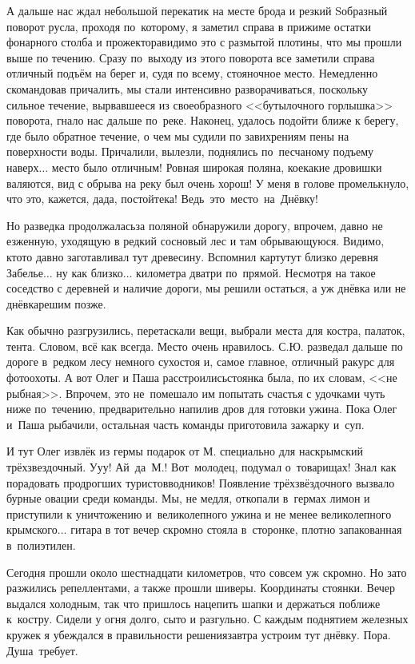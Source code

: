 А дальше нас ждал небольшой перекатик на месте брода и резкий S\sdash образный поворот русла, проходя по~которому, я заметил справа в прижиме остатки фонарного столба и прожектора\mdash видимо это с размытой плотины, что мы прошли выше по течению. Сразу по~выходу из этого поворота все заметили справа отличный подъём на берег и, судя по всему, стояночное место. Немедленно скомандовав причалить, мы стали интенсивно разворачиваться, поскольку сильное течение, вырвавшееся из своеобразного <<бутылочного горлышка>> поворота, гнало нас дальше по~реке. Наконец, удалось подойти ближе к берегу, где было обратное течение, о чем мы судили по завихрениям пены на поверхности воды. Причалили, вылезли, поднялись по~песчаному подъему наверх$\ldots$ место было отличным! Ровная широкая поляна, кое\sdash какие дровишки валяются, вид с обрыва на реку был очень хорош! У меня в голове промелькнуло, что это, кажется, да\sdash да, постойте\sdash ка! Ведь~это~место~на~Днёвку! 

Но разведка продолжалась\mdash за поляной обнаружили дорогу, впрочем, давно не езженную, уходящую в редкий сосновый лес и там обрывающуюся. Видимо, кто\sdash то давно заготавливал тут древесину. Вспомнил карту\mdash тут близко деревня Забелье$\ldots$ ну как близко$\ldots$ километра два\sdash три по~прямой. Несмотря на такое соседство с деревней и наличие дороги, мы решили остаться, а уж днёвка или не днёвка\mdash решим позже.

Как обычно разгрузились, перетаскали вещи, выбрали места для костра, палаток, тента. Словом, всё как всегда. Место очень нравилось. С.Ю. разведал дальше по дороге в~редком лесу немного сухостоя и, самое главное, отличный ракурс для фотоохоты. А вот Олег и Паша расстроились\mdash стоянка была, по их словам, <<не рыбная>>. Впрочем, это не~помешало им попытать счастья с удочками чуть ниже по~течению, предварительно напилив дров для готовки ужина. Пока Олег и~Паша рыбачили, остальная часть команды приготовила зажарку и~суп.

И тут Олег извлёк из гермы подарок от М. специально для нас\mdash крымский трёхзвездочный. У\sdash у\sdash у! Ай~да~М.! Вот~молодец, подумал о~товарищах! Знал как порадовать продрогших туристов\sdash водников! Появление трёхзвёздочного вызвало бурные овации среди команды. Мы, не медля, откопали в~гермах лимон и приступили к уничтожению и~великолепного ужина и не менее великолепного крымского$\ldots$ гитара в тот вечер скромно стояла в~сторонке, плотно запакованная в~полиэтилен. 

Сегодня прошли около шестнадцати километров, что совсем уж скромно. Но зато разжились репеллентами, а также прошли шиверы. Координаты стоянки\mdash \CoordsLidSeventeenDnevka. Вечер выдался холодным, так что пришлось нацепить шапки и держаться поближе к~костру. Сидели у огня долго, сыто и разгульно. С каждым поднятием железных кружек я убеждался в правильности решения\mdash завтра устроим тут днёвку. Пора. Душа~требует. 

\begin{center}
\end{center}
